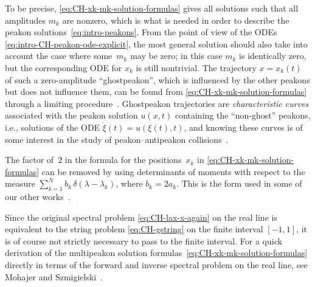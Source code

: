 \documentclass[10pt,a4paper]{article} \pdfoutput=1 
\begin{document}
\begin{remark}
  To be precise, \eqref{eq:CH-xk-mk-solution-formulas} gives all solutions such that
  all amplitudes $m_k$ are nonzero,
  which is what is needed in order to describe the peakon solutions~\eqref{eq:intro-peakons}.
  From the point of view of the ODEs \eqref{eq:intro-CH-peakon-ode-explicit},
  the most general solution should also take into account the case where some~$m_k$
  may be zero;
  in this case $m_k$ is identically zero, but the corresponding ODE for $x_k$ is still nontrivial.
  The trajectory $x = x_k(t)$ of such a zero-amplitude ``ghostpeakon'', which is influenced by the other
  peakons but does not influence them, can be found from \eqref{eq:CH-xk-mk-solution-formulas}
  through a limiting procedure~\cite{lundmark-shuaib:2019:ghostpeakons}.
  Ghostpeakon trajectories are \emph{characteristic curves}
  associated with the peakon solution $u(x,t)$ containing the ``non-ghost'' peakons,
  i.e., solutions of the ODE $\dot \xi(t) = u(\xi(t),t)$,
  and knowing these curves is of some interest in the study of peakon--antipeakon
  collisions~\cite{grunert-holden:2016:CH-peakon-antipeakon-alpha-dissipative}.
\end{remark}

\begin{remark}
  The factor of~$2$ in the formula for the positions~$x_k$ in \eqref{eq:CH-xk-mk-solution-formulas} can be removed by using determinants
  of moments with respect to the measure $\sum_{k=1}^N b_k \, \delta(\lambda - \lambda_k)$,
  where $b_k = 2 a_k$.
  This is the form used in some of our other works~\cite{lundmark:2007:DP-shockpeakons,lundmark-shuaib:2019:ghostpeakons}.
\end{remark}

\begin{remark}
  \label{rem:CH-inverse-problem-on-the-real-line}
  Since the original spectral problem \eqref{eq:CH-lax-x-again}
  on the real line is equivalent to the string problem \eqref{eq:CH-gstring}
  on the finite interval $[-1,1]$, it is of course not strictly necessary to pass to
  the finite interval.
  For a quick derivation of the multipeakon solution formulas~\eqref{eq:CH-xk-mk-solution-formulas}
  directly in terms of the forward and inverse spectral problem on the real line,
  see Mohajer and Szmigielski~\cite{mohajer-szmigielski:2011:CH-on-real-axis}.
\end{remark}
\end{document}
